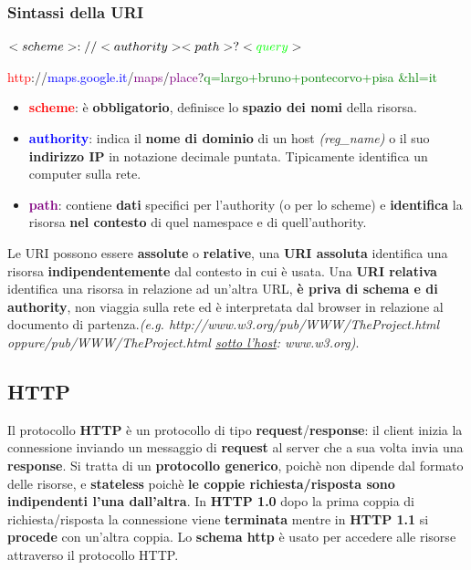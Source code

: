 \documentclass[11pt,a4paper,oneside]{book}
\theoremstyle{definition}
\begin{document}
\subsubsection{Sintassi della URI}
\begin{center}
	\Large$<scheme>://<authority><path>?<\textcolor{green}{query}>$
\end{center}
\textcolor{red}{http}://\textcolor{blue}{maps.google.it}/\textcolor{purple}{maps}/\textcolor{purple}{place}?\textcolor{green}{q=largo+bruno+pontecorvo+pisa
	\&hl=it}
\begin{itemize}
	\item \textcolor{red}{\textbf{scheme}}: è \textbf{obbligatorio}, definisce lo \textbf{spazio dei nomi} della risorsa.
	\item \textcolor{blue}{\textbf{authority}}: indica il \textbf{nome di dominio} di un host \textit{(reg\_name)} o il suo \textbf{indirizzo IP} in notazione decimale puntata. Tipicamente identifica un computer sulla rete.
	\item \textcolor{purple}{\textbf{path}}: contiene \textbf{dati} specifici per l’authority (o per lo scheme) e \textbf{identifica} la risorsa \textbf{nel contesto} di quel namespace e di quell'authority.
\end{itemize}
Le URI possono essere \textbf{assolute} o \textbf{relative}, una \textbf{URI assoluta} identifica una risorsa \textbf{indipendentemente} dal contesto in cui è usata. Una \textbf{URI relativa} identifica una risorsa in relazione ad un'altra URL, \textbf{è priva di schema e di authority}, non viaggia sulla rete ed è interpretata dal browser in relazione al documento di partenza.\newline \textit{(e.g. http://www.w3.org/pub/WWW/TheProject.html oppure\newline /pub/WWW/TheProject.html \underline{sotto l'host}: www.w3.org)}.
\subsection{HTTP}
\label{sec:HTTP}
Il protocollo \textbf{HTTP} è un protocollo di tipo \textbf{request}/\textbf{response}: il client inizia la connessione inviando un messaggio di \textbf{request} al server che a sua volta invia una \textbf{response}. Si tratta di un \textbf{protocollo generico}, poichè non dipende dal formato delle risorse, e \textbf{stateless} poichè \textbf{le coppie richiesta/risposta sono indipendenti l'una dall'altra}. In \textbf{HTTP 1.0} dopo la prima coppia di richiesta/risposta la connessione viene \textbf{terminata} mentre in \textbf{HTTP 1.1} si \textbf{procede} con un’altra coppia. \newline
Lo \textbf{schema http} è usato per accedere alle risorse attraverso il protocollo HTTP.
\end{document}
